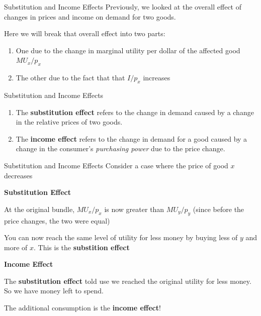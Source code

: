 \documentclass[11pt,t]{beamer}
\begin{document}
\begin{frame}{Substitution and Income Effects}
  Previously, we looked at the overall effect of changes in prices and income on demand for two goods.

  Here we will break that overall effect into two parts:

  \begin{enumerate}
    \item One due to the change in marginal utility per dollar of the affected good $MU_x / p_x$ 
    
    \item The other due to the fact that that $I / p_x$ increases
  \end{enumerate}
  
\end{frame}

\begin{frame}{Substitution and Income Effects}
  \begin{enumerate}
    \item The \textbf{substitution effect} refers to the change in demand caused by a change in the relative prices of two goods.

    \item The \textbf{income effect} refers to the change in demand for a good caused by a change in the consumer's  \textit{purchasing power} due to the price change.
  \end{enumerate}
\end{frame}

\begin{frame}{Substitution and Income Effects}
  Consider a case where the price of good $x$ decreases
  
  \bigskip
  \textbf{Substitution Effect}
  
  At the original bundle, $MU_x/p_x$ is now greater than $MU_y/p_y$ (since before the price changes, the two were equal)

  \smallskip
  You can now reach the same level of utility for less money by buying less of $y$ and more of $x$. This is the \textbf{substition effect}

  \bigskip
  \textbf{Income Effect}
  
  The \textbf{substitution effect} told use we reached the original utility for less money. So we have money left to spend. 
  
  \smallskip
  The additional consumption is the \textbf{income effect}!
\end{frame}
\end{document}
